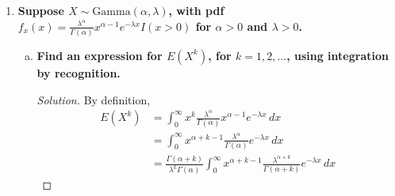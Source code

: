 \documentclass[11pt]{article}
\newenvironment{solution}
  {\renewcommand\qedsymbol{$\blacksquare$}\begin{proof}[Solution]}
  {\end{proof}}
\begin{document}
\begin{enumerate}
	\begin{solution} The expected value of $X$, $E(X)$, is not $0$ as the expectation of $|X|$, $E(|X|)$, is not defined. Note that by definition (and symmetry), 
	\[
		E(|X|) = \sum_{i=-\infty}^{\infty} \frac{c|x|}{(1+x)^2} = 2c\sum_{i=0}^{\infty} \frac{|x|}{(1+x)^2} = 2c\sum_{i=1}^{\infty} \frac{x}{(1+x)^2}
	\]
	
	We claim that for all positive integers $x$, $(1+x)^2 \leq 5x^2$, or equivalently, $5x^2 - (1+x)^2 \geq 0$, in an attempt to bound this expected value. Note that upon completing the square, we find that 
	\[
		5x^2 - (1+x)^2 = 4\left( x - \frac{1}{4} \right)^2 - \frac{5}{4}.
	\]

	Since $4\left( x - \frac{1}{4} \right)^2 - \frac{5}{4}$ is increasing and greater than $0$ when $x = 1$, it follows that $(1+x)^2 \leq 5x^2$. \\

	The above inequality gives us a lower bound for the expected value of $|X|$: 
	\begin{align*}
		E(|X|) &= 2c\sum_{i=1}^{\infty} \frac{x}{(1+x)^2} \\
		&> 2c \sum_{i=1}^{\infty} \frac{x}{5x^2} = \frac{2c}{5} \sum_{i=1}^{\infty} \frac{1}{x}.
	\end{align*} 
	
	Since the harmonic series diverges and is a lower bound for $E(|X|)$, it follows that $E(|X|)$ diverges and is consequently not defined. Thus, $E(X) \neq 0$.
	\end{solution}
	\newpage
	
	\item \textbf{Suppose $X \sim \mathrm{Gamma}(\alpha, \lambda)$, with pdf $f_x(x) = \frac{\lambda^\alpha}{\Gamma(\alpha)}x^{\alpha - 1}e^{-\lambda x}I(x > 0)$ for $\alpha > 0$ and $\lambda > 0$.}
	
	\begin{enumerate}[a)]
	  \item \textbf{Find an expression for $E(X^k)$, for $k = 1, 2, \dots$, using integration by recognition.}
	  
	\begin{solution}
	By definition,
	\begin{align*}
		E(X^k) &= \int_0^{\infty} x^k \frac{\lambda^\alpha}{\Gamma(\alpha)}x^{\alpha - 1}e^{-\lambda x} \, dx \\
		&= \int_0^{\infty} x^{\alpha + k - 1} \frac{\lambda^\alpha}{\Gamma(\alpha)}e^{-\lambda x} \, dx \\
		&= \frac{\Gamma(\alpha + k)}{\lambda^k \Gamma(\alpha)}\int_0^{\infty} x^{\alpha + k - 1} \frac{\lambda^{\alpha+k}}{\Gamma(\alpha + k)}e^{-\lambda x} \, dx
	\end{align*}


\end{solution}
\end{enumerate}
\end{enumerate}
\end{document}
